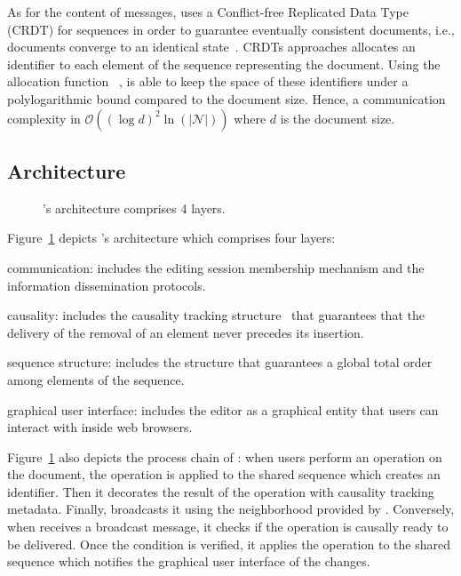 As for the content of messages, \CRATE uses a Conflict-free Replicated Data
Type~\cite{shapiro2011conflict, shapiro2011comprehensive} (CRDT) for sequences
in order to guarantee eventually consistent documents, i.e., documents converge
to an identical state~\cite{bailis2013eventual}. CRDTs approaches allocates an
identifier to each element of the sequence representing the document. Using the
allocation function \LSEQ~\cite{nedelec2013lseq}, \CRATE is able to keep the
space of these identifiers under a polylogarithmic bound compared to the
document size. Hence, a communication complexity in
$\mathcal{O}((\log d)^2\ln(|\mathcal{N}|))$ where $d$ is the document size.

\subsection{Architecture}

\begin{figure}
  \centering
  
  \caption{\label{fig:architecture}\CRATE's architecture comprises 4
    layers. }
\end{figure}



Figure~\ref{fig:architecture} depicts \CRATE's architecture which comprises four
layers:
\begin{inparaenum}[(i)]
\item communication: includes the editing session membership mechanism and the
  information dissemination protocols.
\item causality: includes the causality tracking
  structure~\cite{malkhi2007concise} that guarantees that the delivery of the
  removal of an element never precedes its insertion.
\item sequence structure: includes the structure that guarantees a global
  total order among elements of the sequence.
\item graphical user interface: includes the editor as a graphical entity that
  users can interact with inside web browsers.
\end{inparaenum}
Figure~\ref{fig:architecture} also depicts the process chain of \CRATE: when
users perform an operation on the document, the operation is applied to the
shared sequence which creates an \LSEQ identifier. Then it decorates the result
of the operation with causality tracking metadata. Finally, \CRATE broadcasts it
using the neighborhood provided by \SPRAY.  Conversely, when \CRATE receives a
broadcast message, it checks if the operation is causally ready to be
delivered. Once the condition is verified, it applies the operation to the
shared sequence which notifies the graphical user interface of the changes.

